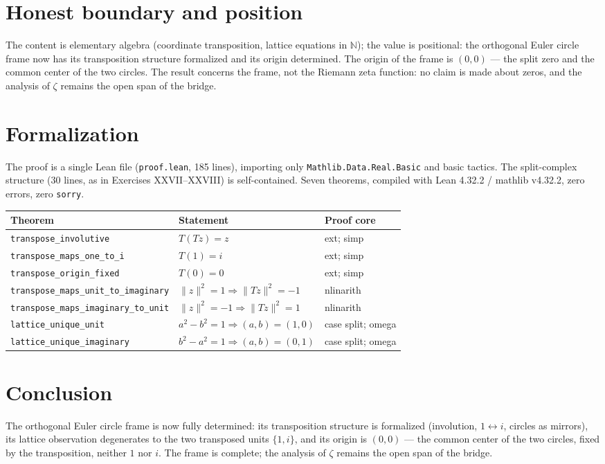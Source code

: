 \documentclass[sigplan,10pt,anonymous,review]{acmart}
\begin{document}
\section{Honest boundary and position}

The content is elementary algebra (coordinate transposition, lattice
equations in $\mathbb{N}$); the value is positional: the orthogonal
Euler circle frame now has its transposition structure formalized and
its origin determined. The origin of the frame is $(0,0)$ --- the split
zero and the common center of the two circles. The result concerns the
frame, not the Riemann zeta function: no claim is made about zeros, and
the analysis of $\zeta$ remains the open span of the bridge.

\section{Formalization}

The proof is a single Lean file (\texttt{proof.lean}, 185 lines),
importing only \texttt{Mathlib.Data.Real.Basic} and basic tactics. The
split-complex structure (30 lines, as in Exercises XXVII--XXVIII) is
self-contained. Seven theorems, compiled with Lean 4.32.2 / mathlib
v4.32.2, zero errors, zero \texttt{sorry}.

\begin{center}
\begin{tabular}{lll}
\toprule
Theorem & Statement & Proof core \\
\midrule
\texttt{transpose\_involutive} & $T(T z) = z$ & ext; simp \\
\texttt{transpose\_maps\_one\_to\_i} & $T(1) = i$ & ext; simp \\
\texttt{transpose\_origin\_fixed} & $T(0) = 0$ & ext; simp \\
\texttt{transpose\_maps\_unit\_to\_imaginary} & $\|z\|^2 = 1 \Rightarrow \|Tz\|^2 = -1$ & nlinarith \\
\texttt{transpose\_maps\_imaginary\_to\_unit} & $\|z\|^2 = -1 \Rightarrow \|Tz\|^2 = 1$ & nlinarith \\
\texttt{lattice\_unique\_unit} & $a^2 - b^2 = 1 \Rightarrow (a,b) = (1,0)$ & case split; omega \\
\texttt{lattice\_unique\_imaginary} & $b^2 - a^2 = 1 \Rightarrow (a,b) = (0,1)$ & case split; omega \\
\bottomrule
\end{tabular}
\end{center}

\section{Conclusion}

The orthogonal Euler circle frame is now fully determined: its
transposition structure is formalized (involution, $1 \leftrightarrow
i$, circles as mirrors), its lattice observation degenerates to the two
transposed units $\{1, i\}$, and its origin is $(0,0)$ --- the common
center of the two circles, fixed by the transposition, neither $1$ nor
$i$. The frame is complete; the analysis of $\zeta$ remains the open
span of the bridge.



\end{document}
